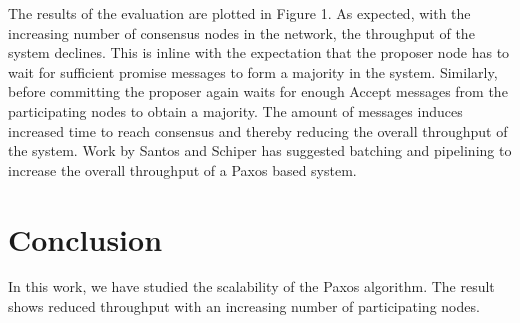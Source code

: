 The results of the evaluation are plotted in Figure 1. 
As expected, with the increasing number of consensus nodes in the network, the throughput of the system declines. 
This is inline with the expectation that the proposer node has to wait for sufficient promise messages to form a majority in the system. 
Similarly, before committing the proposer again waits for enough Accept messages from the participating nodes to obtain a majority. 
The amount of messages induces increased time to reach consensus and thereby reducing the overall throughput of the system. 
Work by Santos and Schiper \cite{santos2012tuning} has suggested batching and pipelining to increase the overall throughput of a Paxos based system. 
\section{Conclusion}
In this work, we have studied the scalability of the Paxos algorithm. The result shows reduced throughput with an increasing number of participating nodes. 

